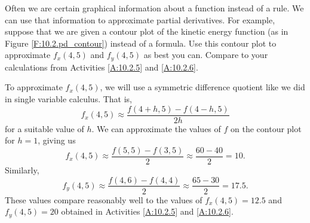 \begin{activity} \label{A:10.2.7} Often we are certain graphical information about a function instead of a rule. We can use that information to approximate partial derivatives. For example, suppose that we are given a contour plot of the kinetic energy function (as in Figure \ref{F:10.2.pd_contour}) instead of a formula. Use this contour plot to approximate $f_x(4,5)$ and $f_y(4,5)$ as best you can. Compare to your calculations from Activities \ref{A:10.2.5} and \ref{A:10.2.6}.


\end{activity}
\begin{smallhint}

\end{smallhint}
\begin{bighint}

\end{bighint}
\begin{activitySolution}
To approximate $f_x(4,5)$, we will use a symmetric difference quotient like we did in single variable calculus. That is,
\[f_x(4,5) \approx \frac{f(4+h,5)-f(4-h,5)}{2h}\]
for a suitable value of $h$. We can approximate the values of $f$ on the contour plot for $h = 1$, giving us 
\[f_x(4,5) \approx  \frac{f(5,5)-f(3,5)}{2} \approx \frac{60-40}{2} = 10.\]
Similarly,
\[f_y(4,5) \approx  \frac{f(4,6)-f(4,4)}{2} \approx \frac{65-30}{2} = 17.5.\]
These values compare reasonably well to the values of $f_x(4,5) = 12.5$ and $f_y(4,5) = 20$ obtained in Activities \ref{A:10.2.5} and \ref{A:10.2.6}. 
\end{activitySolution}
\aftera
